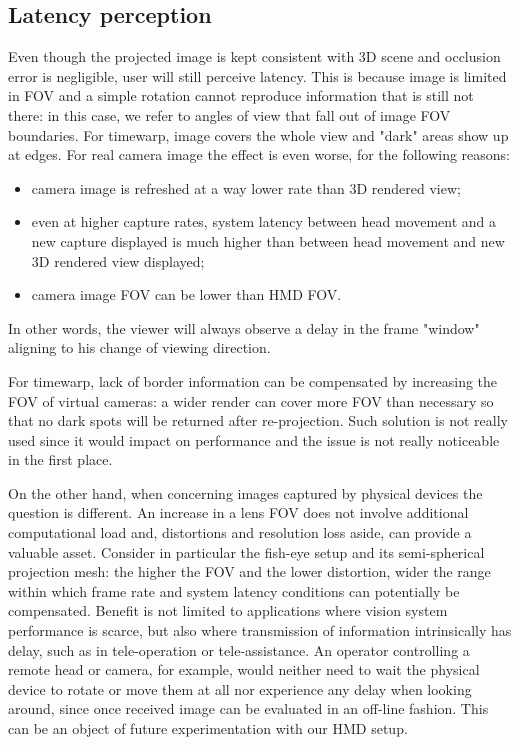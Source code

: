 \subsection{Latency perception}
Even though the projected image is kept consistent with 3D scene and occlusion error is negligible, user will still perceive latency. This is because image is limited in FOV and a simple rotation cannot reproduce information that is still not there: in this case, we refer to angles of view that fall out of image FOV boundaries. For timewarp, image covers the whole view and "dark" areas show up at edges. For real camera image the effect is even worse, for the following reasons:
\begin{itemize}
\item camera image is refreshed at a way lower rate than 3D rendered view;
\item even at higher capture rates, system latency between head movement and a new capture displayed is much higher than between head movement and new 3D rendered view displayed;
\item camera image FOV can be lower than HMD FOV.
\end{itemize}
In other words, the viewer will always observe a delay in the frame "window" aligning to his change of viewing direction.

For timewarp, lack of border information can be compensated by increasing the FOV of virtual cameras: a wider render can cover more FOV than necessary so that no dark spots will be returned after re-projection. Such solution is not really used since it would impact on performance and the issue is not really noticeable in the first place.

On the other hand, when concerning images captured by physical devices the question is different. An increase in a lens FOV does not involve additional computational load and, distortions and resolution loss aside, can provide a valuable asset. Consider in particular the fish-eye setup and its semi-spherical projection mesh: the higher the FOV and the lower distortion, wider the range within which frame rate and system latency conditions can potentially be compensated. Benefit is not limited to applications where vision system performance is scarce, but also where transmission of information intrinsically has delay, such as in tele-operation or tele-assistance. An operator controlling a remote head or camera, for example, would neither need to wait the physical device to rotate or move them at all nor experience any delay when looking around, since once received image can be evaluated in an off-line fashion. This can be an object of future experimentation with our HMD setup.

